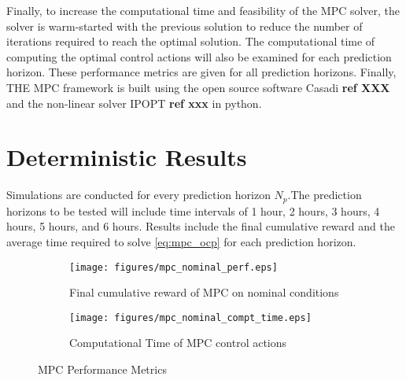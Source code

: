 Finally, to increase the computational time and feasibility of the MPC solver, the solver is warm-started with the previous solution to reduce the number of iterations required to reach the optimal solution. The computational time of computing the optimal control actions will also be examined for each prediction horizon. These performance metrics are given for all prediction horizons. Finally, THE MPC framework is built using the open source software Casadi \textbf{ref XXX} and the non-linear solver IPOPT \textbf{ref xxx} in python. 

\section{Deterministic Results}
Simulations are conducted for every prediction horizon $N_p$.The prediction horizons to be tested will include time intervals of 1 hour, 2 hours, 3 hours, 4 hours, 5 hours, and 6 hours. Results include the final cumulative reward and the average time required to solve \autoref{eq:mpc_ocp} for each prediction horizon.

\begin{figure}[h]
	\centering
	\begin{subfigure}[b]{0.49\textwidth}
		\centering
		\texttt{[image: figures/mpc\_nominal\_perf.eps]}
		\caption{Final cumulative reward of MPC on nominal conditions}
		\label{fig:mpc_nominal_perf}
	\end{subfigure}
	\hfill
	\begin{subfigure}[b]{0.49\textwidth}
		\centering
		\texttt{[image: figures/mpc\_nominal\_compt\_time.eps]}
		\caption{Computational Time of MPC control actions}
		\label{fig:mpc_nominal_comp_time}
	\end{subfigure}
	\caption{MPC Performance Metrics}
	\label{fig:mpc_metrics_nominal}
\end{figure}

